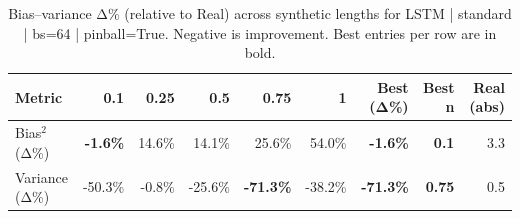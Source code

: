 \renewcommand{\arraystretch}{1.2}
\begin{table}[!t]
\centering
\footnotesize
\caption{Bias–variance Δ\% (relative to Real) across synthetic lengths for LSTM | standard | bs=64 | pinball=True. Negative is improvement. Best entries per row are in bold.}
\label{tab:bvdelta_LSTM_standard_bs64_pinballTrue}
\setlength{\tabcolsep}{5pt}
\begin{tabular}{lrrrrrrrr}
\toprule
Metric & 0.1 & 0.25 & 0.5 & 0.75 & 1 & Best (Δ\%) & Best n & Real (abs) \\
\midrule
Bias$^2$ (Δ\%) & \textbf{-1.6\%} & 14.6\% & 14.1\% & 25.6\% & 54.0\% & \textbf{-1.6\%} & \textbf{0.1} & 3.3 \\
Variance (Δ\%) & -50.3\% & -0.8\% & -25.6\% & \textbf{-71.3\%} & -38.2\% & \textbf{-71.3\%} & \textbf{0.75} & 0.5 \\
\bottomrule
\end{tabular}

\end{table}
